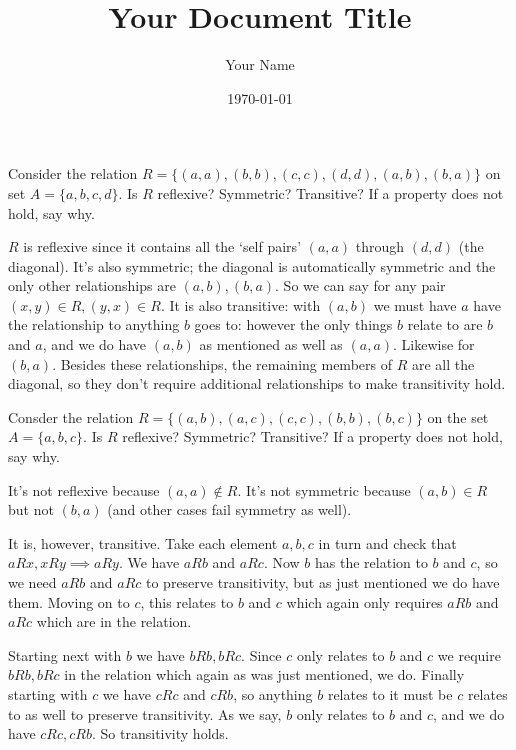 \documentclass{article}
\title{Your Document Title}
\author{Your Name}
\date{\today} %
\begin{document}
\maketitle

\begin{problem}
Consider the relation $R = \{(a, a), (b, b), (c, c), (d, d), (a, b), (b, a)\}$ on set $A = \{a, b, c, d\}$. Is $R$ reflexive? Symmetric? Transitive? If a property does not hold, say why.
\end{problem}

$R$ is reflexive since it contains all the `self pairs' $(a, a)$ through $(d, d)$ (the diagonal). It's also symmetric; the diagonal is automatically symmetric and the only other relationships are $(a, b), (b, a)$. So we can say for any pair $(x, y) \in R, (y, x) \in R$. It is also transitive: with $(a, b)$ we must have $a$ have the relationship to anything $b$ goes to: however the only things $b$ relate to are $b$ and $a$, and we do have $(a, b)$ as mentioned as well as $(a, a)$. Likewise for $(b, a)$. Besides these relationships, the remaining members of $R$ are all the diagonal, so they don't require additional relationships to make transitivity hold.

\begin{problem}
Consder the relation $R =\{(a, b), (a, c), (c, c), (b, b), (b, c)\}$ on the set $A = \{a, b, c\}$. Is $R$ reflexive? Symmetric? Transitive? If a property does not hold, say why.
\end{problem}

It's not reflexive because $(a, a) \not\in R$. It's not symmetric because $(a, b) \in R$ but not $(b, a)$ (and other cases fail symmetry as well).

It is, however, transitive. Take each element $a, b, c$ in turn and check that $aRx, xRy \implies aRy$. We have $aRb$ and $aRc$. Now $b$ has the relation to $b$ and $c$, so we need $aRb$ and $aRc$ to preserve transitivity, but as just mentioned we do have them. Moving on to $c$, this relates to $b$ and $c$ which again only requires $aRb$ and $aRc$ which are in the relation.

Starting next with $b$ we have $bRb, bRc$. Since $c$ only relates to $b$ and $c$ we require $bRb, bRc$ in the relation which again as was just mentioned, we do. Finally starting with $c$ we have $cRc$ and $cRb$, so anything $b$ relates to it must be $c$ relates to as well to preserve transitivity. As we say, $b$ only relates to $b$ and $c$, and we do have $cRc, cRb$. So transitivity holds.
\end{document}
